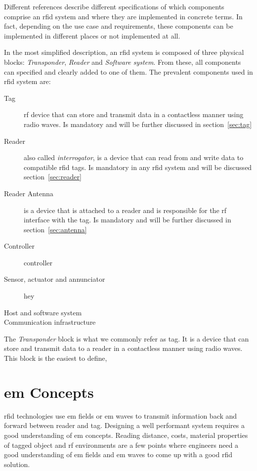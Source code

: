 Different references describe different specifications of which components comprise an \ac{rfid} system and where they are implemented in concrete terms.
In fact, depending on the use case and requirements, these components can be implemented in different places or not implemented at all.

In the most simplified description, an \ac{rfid} system is composed of three physical blocks: \emph{Transponder}, \emph{Reader} and \emph{Software system}. 
From these, all components can specified and clearly added to one of them.
The prevalent components used in \ac{rfid} system are:

\begin{description}
    \item[Tag] \ac{rf} device that can store and transmit data in a contactless manner using radio waves. Is mandatory and will be further discussed in section~\ref{sec:tag}
    \item[Reader] also called \emph{interrogator}, is a device that can read from and write data to compatible \ac{rfid} tags. Is mandatory in any \ac{rfid} system and will be discussed section~\ref{sec:reader}
    \item[Reader Antenna] is a device that is attached to a reader and is responsible for the \ac{rf} interface with the tag. Is mandatory and will be further discussed in section~\ref{sec:antenna}
    \item[Controller] controller
    \item[Sensor, actuator and annunciator] hey 
    \item[Host and software system]
    \item[Communication infrastructure]     
\end{description}

The \emph{Transponder} block is what we commonly refer as tag. It is a device that can store and transmit data to a reader in a contactless manner using radio waves.
This block is the easiest to define, 

\section{\acl{em} Concepts}


\ac{rfid} technologies use \ac{em} fields or \ac{em} waves to transmit information back and forward between reader and tag.
Designing a well performant system requires a good understanding of \ac{em} concepts.
Reading distance, costs, material properties of tagged object and \ac{rf} environments are a few points where engineers need a good understanding of \ac{em} fields and \ac{em} waves to come up with a good \ac{rfid} solution.


